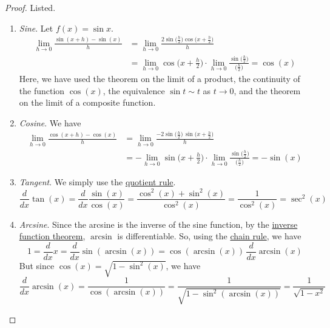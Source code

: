   \begin{proof}
    Listed. 
    \begin{enumerate}
      \item \textit{Sine}. Let $f(x) = \sin{x}$. 
        \begin{align}
          \lim_{h \rightarrow 0} \frac{\sin{(x+h)} - \sin(x)}{h} & = \lim_{h \rightarrow 0} \frac{2 \sin \big( \frac{h}{2} \big) \cos \big( x + \frac{h}{2} \big)}{h} \\
          & = \lim_{h \rightarrow 0} \cos \Big( x + \frac{h}{2} \Big) \cdot \lim_{h\rightarrow 0} \frac{\sin\big( \frac{h}{2}\big)}{\big(\frac{h}{2}\big)} = \cos(x)
        \end{align}
        Here, we have used the theorem on the limit of a product, the continuity of the function $\cos(x)$, the equivalence $\sin{t} \sim t$ as $t \rightarrow 0$, and the theorem on the limit of a composite function. 

      \item \textit{Cosine}. We have 
        \begin{align}
          \lim_{h\rightarrow 0} \frac{\cos(x+h) - \cos(x)}{h} & = \lim_{h \rightarrow 0} \frac{-2 \sin \big(\frac{h}{2}\big) \, \sin \big( x + \frac{h}{2}\big)}{h} \\
          & = - \lim_{h\rightarrow 0} \sin \Big( x + \frac{h}{2} \Big) \cdot \lim_{h\rightarrow0} \frac{\sin\big(\frac{h}{2} \big)}{\big( \frac{h}{2} \big)} = -\sin(x)
        \end{align}

      \item \textit{Tangent}. We simply use the \hyperref[thm:quotient_rule]{quotient rule}. 
        \begin{equation}
          \frac{d}{dx} \tan(x) = \frac{d}{dx} \frac{\sin(x)}{\cos(x)} = \frac{\cos^2 (x) + \sin^2(x)}{\cos^2(x)} = \frac{1}{\cos^2(x)} = \sec^2 (x)
        \end{equation}

      \item \textit{Arcsine}. Since the arcsine is the inverse of the sine function, by the \hyperref[thm:inverse-ft]{inverse function theorem}, $\arcsin$ is differentiable. So, using the \hyperref[thm:chain]{chain rule}, we have 
        \begin{equation}
          1 = \frac{d}{dx} x = \frac{d}{dx} \sin(\arcsin(x)) = \cos(\arcsin(x)) \, \frac{d}{dx} \arcsin(x) 
        \end{equation}
        But since $\cos(x) = \sqrt{1 - \sin^2 (x)}$, we have 
        \begin{equation}
          \frac{d}{dx} \arcsin(x) = \frac{1}{\cos(\arcsin(x))} = \frac{1}{\sqrt{1 - \sin^2(\arcsin(x))}} = \frac{1}{\sqrt{1 - x^2}}
        \end{equation}


\end{enumerate}
\end{proof}
